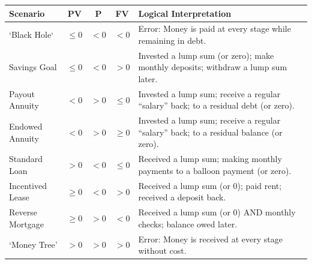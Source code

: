 \documentclass[11pt]{article}%
\begin{document}
\begin{center}
\setlength{\extrarowheight}{1.5pt}
\begin{tabularx}{0.95\columnwidth}{|l|c|c|c|X|} \hline
\textbf{Scenario} & \textbf{PV} & \textbf{P} & \textbf{FV} & \textbf{Logical Interpretation} \\ \hline
`Black Hole` & $\le 0$ & $< 0$ & $< 0$ & Error: Money is paid at every stage while remaining in debt. \\ \hline
Savings Goal & $\le 0$ & $< 0$ & $> 0$ & Invested a lump sum (or zero); make monthly deposits; withdraw a lump sum later. \\ \hline
Payout Annuity & $< 0$ & $> 0$ & $\le 0$ & Invested a lump sum; receive a regular ``salary'' back; to a residual debt (or zero). \\ \hline
Endowed Annuity & $< 0$ & $> 0$ & $\ge 0$ & Invested a lump sum; receive a regular ``salary'' back; to a residual balance (or zero). \\ \hline
Standard Loan & $> 0$ & $< 0$ & $\le 0$ & Received a lump sum; making monthly payments to a balloon payment (or zero). \\ \hline
Incentived Lease & $\ge 0$ & $< 0$ & $> 0$ & Received a lump sum (or 0); paid rent; received a deposit back. \\ \hline
Reverse Mortgage & $\ge 0$ & $> 0$ & $< 0$ &  Received a lump sum (or 0) AND monthly checks; balance owed later. \\ \hline
`Money Tree' & $ > 0$ & $ > 0$ & $ > 0$ &  Error: Money is received at every stage without cost. \\ \hline
\end{tabularx}
\end{center}
\end{document}
